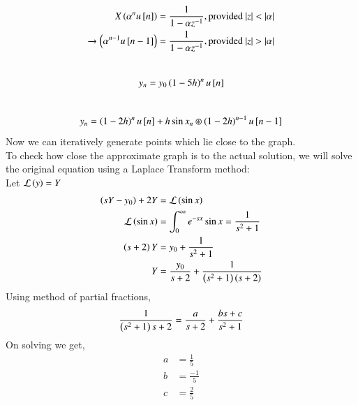 \documentclass[journal]{IEEEtran}
\begin{document}
    \\
    \\
\begin{align}
    X\left(\alpha^nu{}\left[n\right]\right) = \frac{1}{1-\alpha z^{-1}}, \text{provided $|z| < |\alpha|$}\\
    \xrightarrow{} \left(\alpha^{n-1}u{}\left[n-1\right]\right) = \frac{1}{1-\alpha z^{-1}}, \text{provided $|z| > |\alpha|$}
\end{align}
    \\
\begin{align}
    y_n = y_0\left(1-5h\right)^nu{}\left[n\right]
\end{align}
    \\
\begin{align}
    y_n = \left(1-2h\right)^nu{}\left[n\right] + h\sin x_n \circledast \left(1-2h\right)^{n-1}u{}\left[n-1\right]
\end{align}
Now we can iteratively generate points which lie close to the graph.\\
To check how close the approximate graph is to the actual solution, we will solve the original 
equation using a Laplace Transform method:\\
Let $\mathcal{L}\left(y\right) = Y$\\
\begin{align}
    \left(sY - y_0\right) +2Y &= \mathcal{L}\left(\sin x\right)\\
    \mathcal{L}\left(\sin x\right) &= \int_{0}^{\infty} e^{-sx}\sin x = \frac{1}{s^2 + 1}\\
    \left(s + 2\right)Y &= y_0 + \frac{1}{s^2 + 1}\\
    Y &= \frac{y_0}{s + 2} + \frac{1}{\left(s^2+1\right)\left(s+2\right)}\\
\end{align}
    Using method of partial fractions,
    \begin{align}   
        \frac{1}{\left(s^2+1\right){s+2}} = \frac{a}{s+2} + \frac{bs + c}{s^2+1}\\
    \end{align}
    On solving we get,
    \begin{align}
        a &= \frac{1}{5}\\
        b &= \frac{-1}{5}\\
        c &= \frac{2}{5}\\
    \end{align}
\end{document}

